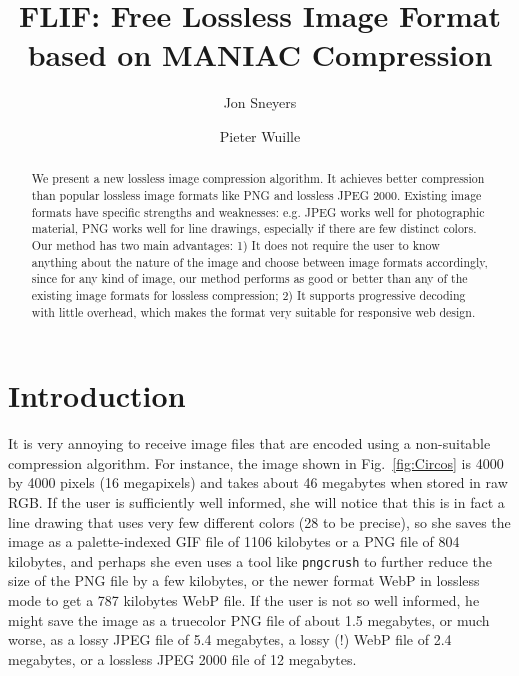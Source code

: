 \documentclass[a4paper,USenglish]{lipics}
\begin{document}
\title{FLIF: Free Lossless Image Format based on MANIAC Compression}

\author[1]{Jon Sneyers}
\author[2]{Pieter Wuille}



\maketitle

\begin{abstract}
We present a new lossless image compression algorithm.
It achieves better compression than popular lossless image formats like PNG and lossless JPEG 2000.
Existing image formats have specific strengths and weaknesses: e.g. JPEG works well for photographic material,
PNG works well for line drawings, especially if there are few distinct colors.
Our method has two main advantages: 1) It does not require the user to know anything about the nature
of the image and choose between image formats accordingly, since for any kind of image,
our method performs as good or better than any of the existing image formats for lossless compression;
2) It supports progressive decoding with little overhead, which makes the format very suitable for responsive web design.
\end{abstract}


\section{Introduction}

It is very annoying to receive image files that are encoded using a non-suitable compression algorithm.
For instance, the image shown in Fig.~\ref{fig:Circos} is 4000 by 4000 pixels (16 megapixels) and takes about
46 megabytes when stored in raw RGB. If the user is sufficiently well informed, she will notice
that this is in fact a line drawing that uses very few different colors (28 to be precise),
so she saves the image as a palette-indexed GIF file of 1106 kilobytes or a PNG file of 804 kilobytes,
and perhaps she even uses a tool like {\tt pngcrush} to further reduce the size of the PNG file by a few kilobytes, or
the newer format WebP in lossless mode to get a 787 kilobytes WebP file.
If the user is not so well informed, he might save the image as a truecolor PNG file
of about 1.5 megabytes, or much worse, as a lossy JPEG file of 5.4 megabytes, a lossy (!) WebP file of
2.4 megabytes, or a lossless JPEG 2000 file of 12 megabytes.
\end{document}
